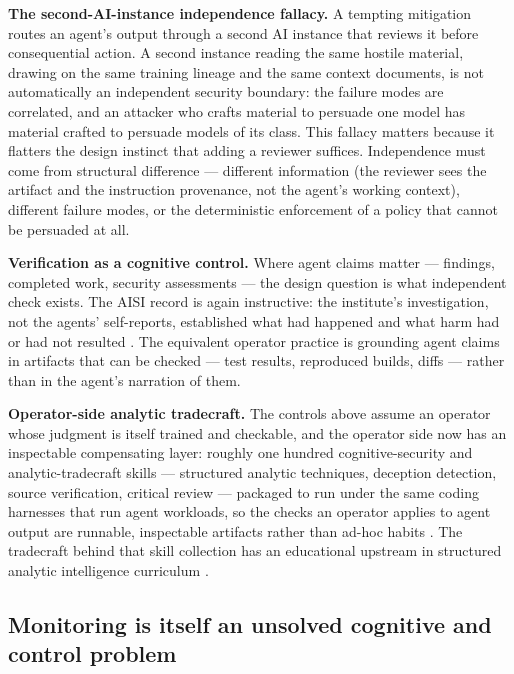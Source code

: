 \documentclass[
  english,
  9pt,
]{extarticle}
\begin{document}
\textbf{The second-AI-instance independence fallacy.} A tempting
mitigation routes an agent's output through a second AI instance that
reviews it before consequential action. A second instance reading the
same hostile material, drawing on the same training lineage and the same
context documents, is not automatically an independent security
boundary: the failure modes are correlated, and an attacker who crafts
material to persuade one model has material crafted to persuade models
of its class. This fallacy matters because it flatters the design
instinct that adding a reviewer suffices. Independence must come from
structural difference --- different information (the reviewer sees the
artifact and the instruction provenance, not the agent's working
context), different failure modes, or the deterministic enforcement of a
policy that cannot be persuaded at all.

\textbf{Verification as a cognitive control.} Where agent claims matter
--- findings, completed work, security assessments --- the design
question is what independent check exists. The AISI record is again
instructive: the institute's investigation, not the agents'
self-reports, established what had happened and what harm had or had not
resulted \citep{aisi_incident_report}. The equivalent operator practice
is grounding agent claims in artifacts that can be checked --- test
results, reproduced builds, diffs --- rather than in the agent's
narration of them.

\textbf{Operator-side analytic tradecraft.} The controls above assume an
operator whose judgment is itself trained and checkable, and the
operator side now has an inspectable compensating layer: roughly one
hundred cognitive-security and analytic-tradecraft skills --- structured
analytic techniques, deception detection, source verification, critical
review --- packaged to run under the same coding harnesses that run
agent workloads, so the checks an operator applies to agent output are
runnable, inspectable artifacts rather than ad-hoc habits
\citep{cogsecskills2026}. The tradecraft behind that skill collection
has an educational upstream in structured analytic intelligence
curriculum \citep{ageint2026}.

\subsection{Monitoring is itself an unsolved cognitive and control
problem}\label{monitoring-is-itself-an-unsolved-cognitive-and-control-problem}
\end{document}
